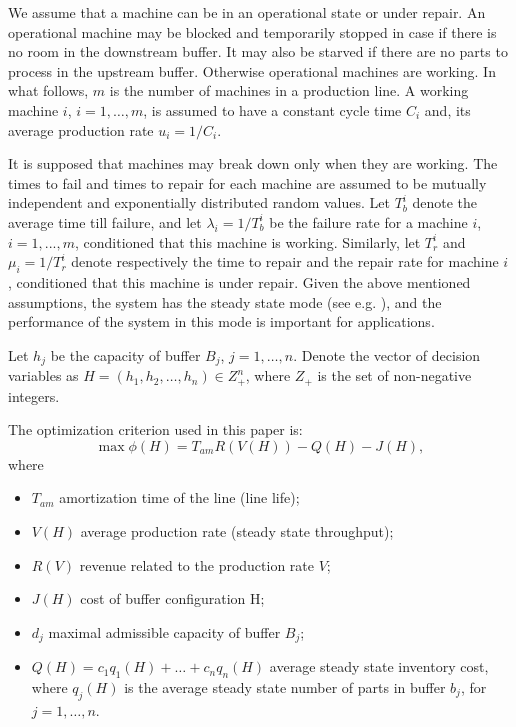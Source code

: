 \documentclass{ifacconf}
\begin{document}
We assume that a machine can be in an operational state or under 
repair. An operational machine may be blocked and temporarily stopped in case if there 
is  no  room  in  the  downstream  buffer.  It  may  also  be  starved  if  there  are  no  parts  to 
process  in  the  upstream  buffer. Otherwise operational machines are working. In what 
follows, $m$ is the number of machines in a production line. A working machine $i$, 
$i=1,…,m$, is assumed to have a constant cycle time $C_i$ and, its average production 
rate $u_i=1/C_i$. 

It is supposed that machines may break down only when they are working. The times to fail 
and  times  to  repair  for  each  machine  are  assumed  to  be  mutually  independent  and 
exponentially distributed random values. Let $T_b^i$ denote the average time till failure, and let 
$\lambda_i=1/T_b^i$ be the failure rate for a machine $i$, $i=1,...,m$, conditioned that this machine is working. Similarly, let $T_r^i$ and $\mu_i=1/T_r^i$  
denote  respectively  the  time  to  repair  and  the repair rate for machine $i$, conditioned that this machine is under repair. Given the 
above  mentioned  assumptions,  the  system  has  the  steady  state  mode  (see  e.g. \cite{Seva62}),  and  the performance  of  the  system  in  this  mode  is  important  for 
applications.

Let $h_j$ be the capacity of buffer 
$B_j$, $j=1,\dots,n$.  Denote  the  vector  of  decision  variables  as  $H=  (h_1,  h_2,…, h_n )\in  Z_+^n$,  where  $Z_+$  is  the  set  of  non-negative  integers.  

The optimization criterion used in this paper is:
\begin{equation}
\label{criteria}
\max \phi(H)=T_{am} R(V(H)) - Q(H) - J(H),
\end{equation}
where 
\begin{itemize}
\item $T_{am}$  amortization time of the line (line life); 
\item $V(H)$  average production rate (steady state throughput); 
\item $R(V)$  revenue related to the production rate $V$; 
\item $J(H)$ cost of buffer configuration H; 
\item $d_j$ maximal admissible capacity of buffer $B_j$;
\item $Q(H)= c_1q_1(H)+ …+c_n q_n(H)$ average steady state inventory cost, where $q_j(H)$ is the average steady state number of parts in buffer $b_j$, for $j=1,…,n$.
\end{itemize}
\end{document}
